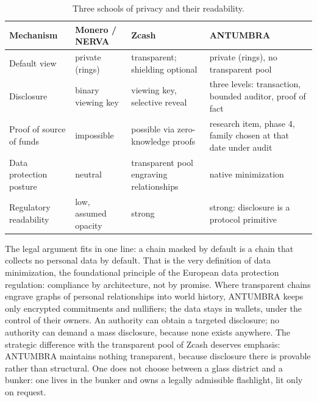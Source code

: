 \begin{table}[htbp]
\centering
\small
\caption{Three schools of privacy and their readability.}
\label{tab:privacy}
\begin{tabularx}{\textwidth}{@{}L{3.1cm}YYY@{}}
\toprule
Mechanism & Monero / NERVA & Zcash & ANTUMBRA \\
\midrule
Default view & private (rings) & transparent; shielding optional & private (rings), no transparent pool \\
Disclosure & binary viewing key & viewing key, selective reveal & three levels: transaction, bounded auditor, proof of fact \\
Proof of source of funds & impossible & possible via zero-knowledge proofs & research item, phase 4, family chosen at that date under audit \\
Data protection posture & neutral & transparent pool engraving relationships & native minimization \\
Regulatory readability & low, assumed opacity & strong & strong: disclosure is a protocol primitive \\
\bottomrule
\end{tabularx}
\end{table}

The legal argument fits in one line: a chain masked by default is a chain
that collects no personal data by default. That is the very definition of
data minimization, the foundational principle of the European data
protection regulation: compliance by architecture, not by promise. Where
transparent chains engrave graphs of personal relationships into world
history, ANTUMBRA keeps only encrypted commitments and nullifiers; the
data stays in wallets, under the control of their owners. An authority
can obtain a targeted disclosure; no authority can demand a mass
disclosure, because none exists anywhere. The strategic difference with
the transparent pool of Zcash deserves emphasis: ANTUMBRA maintains
nothing transparent, because disclosure there is provable rather than
structural. One does not choose between a glass district and a bunker:
one lives in the bunker and owns a legally admissible flashlight, lit
only on request.
